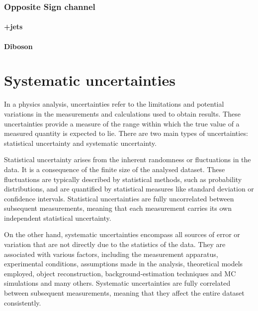 \subsubsection{Opposite Sign channel}


\paragraph{\ttbar}
\paragraph{\PZ+jets}
\paragraph{Diboson}
\paragraph{\tW}


\section{Systematic uncertainties}
\label{sec:ChaptH:Systematics}
In a physics analysis, uncertainties refer to the limitations and potential variations in the measurements 
and calculations used to obtain results. These uncertainties provide a measure of the range within which 
the true value of a measured quantity is expected to lie. There are two main types of uncertainties: 
statistical uncertainty and systematic uncertainty.

Statistical uncertainty arises from the inherent randomness or fluctuations in the data. It is a 
consequence of the finite size of the analysed dataset. These fluctuations are typically described by 
statistical methods, such as probability distributions, and are quantified by statistical measures like 
standard deviation or confidence intervals. Statistical uncertainties are fully uncorrelated between 
subsequent measurements, meaning that each measurement carries its own independent statistical 
uncertainty.

On the other hand, systematic uncertainties encompass all sources of error or variation that are not 
directly due to the statistics of the data. They are associated with various factors, including the measurement apparatus, 
experimental conditions, assumptions made in the analysis, theoretical models employed, object reconstruction, background-estimation techniques and MC 
simulations and many others. Systematic uncertainties are fully correlated between subsequent 
measurements, meaning that they affect the entire dataset consistently.

